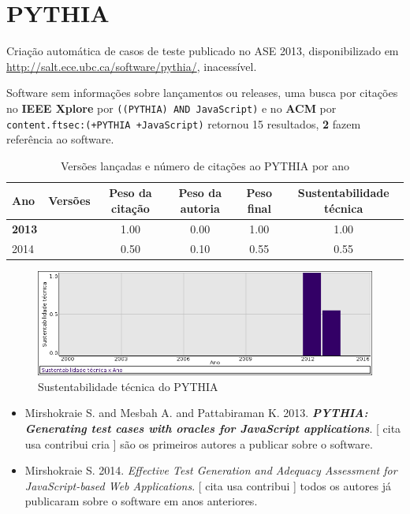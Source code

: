 \section{PYTHIA}

Criação automática de casos de teste
publicado no ASE 2013,
disponibilizado em \url{http://salt.ece.ubc.ca/software/pythia/},
inacessível.

Software sem informações sobre lançamentos ou releases,
uma busca por citações no {\bf IEEE Xplore} por
\texttt{((PYTHIA) AND JavaScript)}
e no {\bf ACM} por
\texttt{content.ftsec:(+PYTHIA +JavaScript)}
retornou
15 resultados,
{\bf 2} fazem referência ao software.


\begin{table}[H]
\caption{Versões lançadas e número de citações ao PYTHIA por ano}
\centering
\begin{tabular}{| l | c | c | c | c | c |}
  \hline
  Ano & Versões & Peso da citação & Peso da autoria & Peso final & Sustentabilidade técnica \\
  \hline
            {\bf 2013}
          &
          
          &
          1.00
          &
          0.00
          &
          1.00
          &
            {\color{blue} 1.00}
          \\
\hline
            2014
          &
          
          &
          0.50
          &
          0.10
          &
          0.55
          &
            {\color{blue} 0.55}
          \\
\hline
\end{tabular}
\end{table}

\begin{figure}[h]
  \center
  \includegraphics[scale=0.50]{imagens/softwares-charts/pythia.png}
  \caption{Sustentabilidade técnica do PYTHIA}
\end{figure}


\begin{itemize}
\item Mirshokraie S. and Mesbah A. and Pattabiraman K.
      2013.
        \textbf{\textit{ PYTHIA: Generating test cases with oracles for JavaScript applications}}.
      [
          cita
          usa
          contribui
          cria
      ]
são os primeiros autores a publicar sobre o software.
\item Mirshokraie S.
      2014.
        \textit{ Effective Test Generation and Adequacy Assessment for JavaScript-based Web Applications}.
      [
          cita
          usa
          contribui
      ]
todos os autores já publicaram sobre o software em anos anteriores.
\end{itemize}
